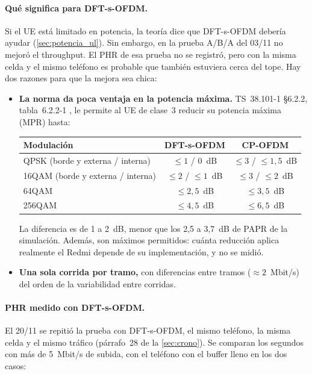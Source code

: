 \paragraph{Qué significa para DFT-s-OFDM.} Si el UE está limitado en potencia, la teoría dice que DFT-s-OFDM debería ayudar (\cref{sec:potencia_ul}). Sin embargo, en la prueba A/B/A del 03/11 no mejoró el throughput. El PHR de esa prueba no se registró, pero con la misma celda y el mismo teléfono es probable que también estuviera cerca del tope. Hay dos razones para que la mejora sea chica:
\begin{itemize}
  \item \textbf{La norma da poca ventaja en la potencia máxima.} TS~38.101-1 §6.2.2, tabla~6.2.2-1 \cite{ts38101}, le permite al UE de clase~3 reducir su potencia máxima (MPR) hasta:

  \begin{center}
  \begin{tabular}{lcc}
  \toprule
  Modulación & DFT-s-OFDM & CP-OFDM \\
  \midrule
  QPSK (borde y externa / interna) & $\le 1$ / 0~dB & $\le 3$ / $\le 1{,}5$~dB \\
  16QAM (borde y externa / interna) & $\le 2$ / $\le 1$~dB & $\le 3$ / $\le 2$~dB \\
  64QAM & $\le 2{,}5$~dB & $\le 3{,}5$~dB \\
  256QAM & $\le 4{,}5$~dB & $\le 6{,}5$~dB \\
  \bottomrule
  \end{tabular}
  \end{center}

  La diferencia es de 1 a 2~dB, menor que los 2,5 a 3,7~dB de PAPR de la simulación. Además, son máximos permitidos: cuánta reducción aplica realmente el Redmi depende de su implementación, y no se midió.
  \item \textbf{Una sola corrida por tramo,} con diferencias entre tramos ($\approx 2$~Mbit/s) del orden de la variabilidad entre corridas.
\end{itemize}
\paragraph{PHR medido con DFT-s-OFDM.} El 20/11 se repitió la prueba con DFT-s-OFDM, el mismo teléfono, la misma celda y el mismo tráfico (párrafo~28 de la \cref{sec:crono}). Se comparan los segundos con más de 5~Mbit/s de subida, con el teléfono con el buffer lleno en los dos casos:

